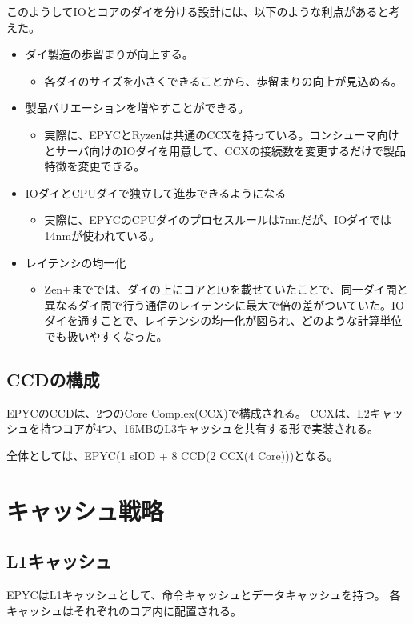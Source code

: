 \documentclass[a4paper,10pt]{jsarticle}
\begin{document}
このようしてIOとコアのダイを分ける設計には、以下のような利点があると考えた。
\begin{itemize}
  \item ダイ製造の歩留まりが向上する。
        \begin{itemize}
          \item 各ダイのサイズを小さくできることから、歩留まりの向上が見込める。
        \end{itemize}
  \item 製品バリエーションを増やすことができる。
        \begin{itemize}
          \item 実際に、EPYCとRyzenは共通のCCXを持っている。コンシューマ向けとサーバ向けのIOダイを用意して、CCXの接続数を変更するだけで製品特徴を変更できる。
        \end{itemize}
  \item IOダイとCPUダイで独立して進歩できるようになる
        \begin{itemize}
          \item 実際に、EPYCのCPUダイのプロセスルールは7nmだが、IOダイでは14nmが使われている。
        \end{itemize}
  \item レイテンシの均一化
        \begin{itemize}
          \item Zen+まででは、ダイの上にコアとIOを載せていたことで、同一ダイ間と異なるダイ間で行う通信のレイテンシに最大で倍の差がついていた。IOダイを通すことで、レイテンシの均一化が図られ、どのような計算単位でも扱いやすくなった。
        \end{itemize}
\end{itemize}

\subsection{CCDの構成}
EPYCのCCDは、2つのCore Complex(CCX)で構成される。
CCXは、L2キャッシュを持つコアが4つ、16MBのL3キャッシュを共有する形で実装される。

全体としては、EPYC(1 sIOD + 8 CCD(2 CCX(4 Core)))となる。

\section{キャッシュ戦略}
\subsection{L1キャッシュ}
EPYCはL1キャッシュとして、命令キャッシュとデータキャッシュを持つ。
各キャッシュはそれぞれのコア内に配置される。
\end{document}
